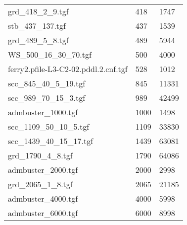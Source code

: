 \begin{longtable}{| p{} | p{} | p{} | }
	grd\_418\_2\_9.tgf                                                             & 418  & 1747    \\
	stb\_437\_137.tgf                                                              & 437  & 1539    \\
	grd\_489\_5\_8.tgf                                                             & 489  & 5944    \\
	WS\_500\_16\_30\_70.tgf                                                        & 500  & 4000    \\
	ferry2.pfile-L3-C2-02.pddl.2.cnf.tgf                                           & 528  & 1012    \\
	scc\_845\_40\_5\_19.tgf                                                        & 845  & 11331   \\
	scc\_989\_70\_15\_3.tgf                                                        & 989  & 42499   \\
	admbuster\_1000.tgf                                                            & 1000 & 1498    \\
	scc\_1109\_50\_10\_5.tgf                                                       & 1109 & 33830   \\
	scc\_1439\_40\_15\_17.tgf                                                      & 1439 & 63081   \\
	grd\_1790\_4\_8.tgf                                                            & 1790 & 64086   \\
	admbuster\_2000.tgf                                                            & 2000 & 2998    \\
	grd\_2065\_1\_8.tgf                                                            & 2065 & 21185   \\
	admbuster\_4000.tgf                                                            & 4000 & 5998    \\
	admbuster\_6000.tgf                                                            & 6000 & 8998   
\end{longtable}